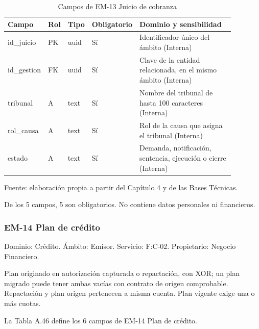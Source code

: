 \documentclass[11pt]{article}
\begin{document}
\begin{table}[htbp]
\caption{Campos de EM-13 Juicio de cobranza}\label{tab:d_em13}
\centering
\begin{tabular}{@{}p{0.167\linewidth}p{0.070\linewidth}p{0.079\linewidth}p{0.097\linewidth}p{0.465\linewidth}@{}}
\toprule Campo & Rol & Tipo & Obligatorio & Dominio y sensibilidad \\
\midrule
id\_juicio & PK & uuid & Sí & Identificador único del ámbito (Interna) \\
id\_gestion & FK & uuid & Sí & Clave de la entidad relacionada, en el mismo ámbito (Interna) \\
tribunal & A & text & Sí & Nombre del tribunal de hasta 100 caracteres (Interna) \\
rol\_causa & A & text & Sí & Rol de la causa que asigna el tribunal (Interna) \\
estado & A & text & Sí & Demanda, notificación, sentencia, ejecución o cierre (Interna) \\
\bottomrule
\end{tabular}
\par\smallskip
{\raggedright Fuente: elaboración propia a partir del Capítulo 4 y de las Bases Técnicas.\par}
\end{table}


De los 5 campos, 5 son obligatorios. No contiene datos personales ni financieros.

\subsubsection{EM-14 Plan de crédito}

Dominio: Crédito. Ámbito: Emisor. Servicio: F:C-02. Propietario: Negocio Financiero.

Plan originado en autorización capturada o repactación, con XOR; un plan migrado puede tener ambas vacías con contrato de origen comprobable. Repactación y plan origen pertenecen a misma cuenta. Plan vigente exige una o más cuotas.

La Tabla A.46 define los 6 campos de EM-14 Plan de crédito.

\clearpage
\end{document}
